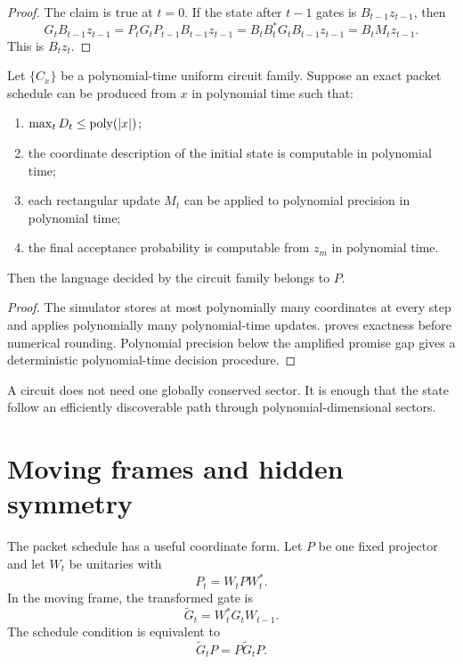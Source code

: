 \begin{proof}
The claim is true at $t=0$. If the state after $t-1$ gates is $B_{t-1}z_{t-1}$, then
\[
G_tB_{t-1}z_{t-1}
=P_tG_tP_{t-1}B_{t-1}z_{t-1}
=B_tB_t^*G_tB_{t-1}z_{t-1}
=B_tM_tz_{t-1}.
\]
This is $B_tz_t$.
\end{proof}

\begin{theorem}
\label{thm:moving-packet-collapse}
Let $\{C_x\}$ be a polynomial-time uniform circuit family. Suppose an exact packet schedule can be produced from $x$ in polynomial time such that:
\begin{enumerate}
\item $\max_tD_t\le\operatorname{poly}(|x|)$;
\item the coordinate description of the initial state is computable in polynomial time;
\item each rectangular update $M_t$ can be applied to polynomial precision in polynomial time;
\item the final acceptance probability is computable from $z_m$ in polynomial time.
\end{enumerate}
Then the language decided by the circuit family belongs to $P$.
\end{theorem}

\begin{proof}
The simulator stores at most polynomially many coordinates at every step and applies polynomially many polynomial-time updates.  proves exactness before numerical rounding. Polynomial precision below the amplified promise gap gives a deterministic polynomial-time decision procedure.
\end{proof}

\begin{derivedbox}
A circuit does not need one globally conserved sector. It is enough that the state follow an efficiently discoverable path through polynomial-dimensional sectors.
\end{derivedbox}

\section{Moving frames and hidden symmetry}
The packet schedule has a useful coordinate form. Let $P$ be one fixed projector and let $W_t$ be unitaries with
\[
P_t=W_tPW_t^*.
\]
In the moving frame, the transformed gate is
\begin{equation}
\widetilde G_t
=W_t^*G_tW_{t-1}.
\label{eq:moving-frame-gate}
\end{equation}
The schedule condition is equivalent to
\[
\widetilde G_tP=P\widetilde G_tP.
\]

